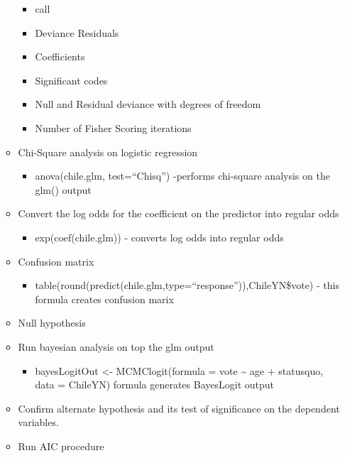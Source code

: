 \documentclass[]{article}
\providecommand{\tightlist}{%
  \setlength{\itemsep}{0pt}\setlength{\parskip}{0pt}}
\begin{document}
\begin{itemize}
\begin{itemize}
    \begin{itemize}
    \tightlist
    \item
      call
    \item
      Deviance Residuals
    \item
      Coefficients
    \item
      Significant codes
    \item
      Null and Residual deviance with degrees of freedom
    \item
      Number of Fisher Scoring iterations
    \end{itemize}
  \item
    Chi-Square analysis on logistic regression

    \begin{itemize}
    \tightlist
    \item
      anova(chile.glm, test=``Chisq'') -performs chi-square analysis on
      the glm() output
    \end{itemize}
  \item
    Convert the log odds for the coefficient on the predictor into
    regular odds

    \begin{itemize}
    \tightlist
    \item
      exp(coef(chile.glm)) - converts log odds into regular odds
    \end{itemize}
  \item
    Confusion matrix

    \begin{itemize}
    \tightlist
    \item
      table(round(predict(chile.glm,type=``response'')),ChileYN\$vote) -
      this formula creates confusion marix
    \end{itemize}
  \item
    Null hypothesis
  \item
    Run bayesian analysis on top the glm output

    \begin{itemize}
    \tightlist
    \item
      bayesLogitOut \textless{}- MCMClogit(formula = vote
      \textasciitilde{} age + statusquo, data = ChileYN) formula
      generates BayesLogit output
    \end{itemize}
  \item
    Confirm alternate hypothesis and its test of significance on the
    dependent variables.
  \item
    Run AIC procedure


\end{itemize}
\end{itemize}
\end{document}

